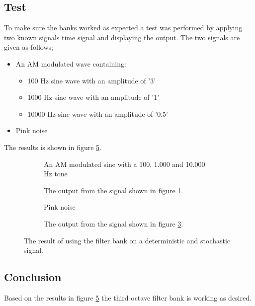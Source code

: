 \subsection{Test}

To make sure the banks worked as expected a test was performed by applying two known signals time signal and displaying the output. The two signals are given as follows;
\vspace{-6mm}
\begin{itemize}
	\item An AM modulated wave containing:
	\begin{itemize}
		\item 100 Hz sine wave with an amplitude of '3'
		\item 1000 Hz sine wave with an amplitude of '1'
		\item 10000 Hz sine wave with an amplitude of '0.5'
	\end{itemize}
	\item Pink noise
\end{itemize}
\vspace{-3mm}
The results is shown in figure \ref{fig:octresults}. 
\begin{figure}[H]
	\centering
	\begin{subfigure}[b]{0.45\textwidth}
		\centering
			
		\caption{An AM modulated sine with a 100, 1.000 and 10.000 Hz tone}
		\label{fig:Signal01k1k10k}
	\end{subfigure}
	\hfill
	\begin{subfigure}[b]{0.45\textwidth}
		\centering
			
		\caption{The output from the signal shown in figure \ref{fig:Signal01k1k10k}.}
		\label{fig:OctFilter01k1k10k}
	\end{subfigure}	
	\begin{subfigure}[b]{0.45\textwidth}
		\centering
			
		\caption{Pink noise}
		\label{fig:PinkNoise5sec}
	\end{subfigure}	
	\hfill
	\begin{subfigure}[b]{0.45\textwidth}
		\centering
		
		\caption{The output from the signal shown in figure \ref{fig:PinkNoise5sec}.}
		\label{fig:OctFilterPink}
	\end{subfigure}	
	\caption{The result of using the filter bank on a deterministic and stochastic signal.}
	\label{fig:octresults}
\end{figure}

\subsection{Conclusion}
Based on the results in figure \ref{fig:octresults} the third octave filter bank is working as desired.
